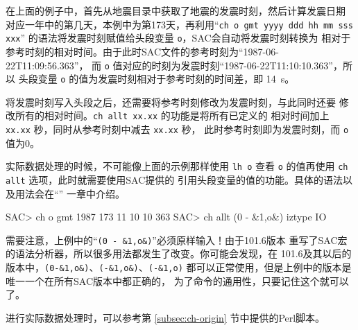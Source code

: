 在上面的例子中，首先从地震目录中获取了地震的发震时刻，然后计算发震日期
对应一年中的第几天，本例中为第173天，再利用``\texttt{ch o gmt yyyy ddd hh mm sss xxx}''
的语法将发震时刻赋值给头段变量 \texttt{o}，SAC会自动将发震时刻转换为
相对于参考时刻的相对时间。由于此时SAC文件的参考时刻为``1987-06-22T11:09:56.363''，
而 \texttt{o} 值对应的时刻为发震时刻``1987-06-22T11:10:10.363''，所以
头段变量 \texttt{o} 的值为发震时刻相对于参考时刻的时间差，即 \SI{14}{\s}。

将发震时刻写入头段之后，还需要将参考时刻修改为发震时刻，与此同时还要
修改所有的相对时间。\texttt{ch allt xx.xx} 的功能是将所有已定义的
相对时间加上 \texttt{xx.xx} 秒，同时从参考时刻中减去 \texttt{xx.xx} 秒，
此时参考时刻即为发震时刻，而 \texttt{o} 值为0。

实际数据处理的时候，不可能像上面的示例那样使用 \texttt{lh o} 查看
\texttt{o} 的值再使用 \texttt{ch allt} 选项，此时就需要使用SAC提供的
引用头段变量的值的功能。具体的语法以及用法会在``''
一章中介绍。

\begin{SACCode}
SAC> ch o gmt 1987 173 11 10 10 363
SAC> ch allt (0 - &1,o&) iztype IO
\end{SACCode}

需要注意，上例中的``\verb|(0 - &1,o&)|''必须原样输入！由于101.6版本
重写了SAC宏的语法分析器，所以很多用法都发生了改变。你可能会发现，在
101.6及其以后的版本中，\verb|(0-&1,o&)|、\verb|(-&1,o&)|、\verb|(-&1,o)| 
都可以正常使用，但是上例中的版本是唯一一个在所有SAC版本中都正确的，
为了命令的通用性，只要记住这个就可以了。

进行实际数据处理时，可以参考第 \ref{subsec:ch-origin} 节中提供的Perl脚本。
